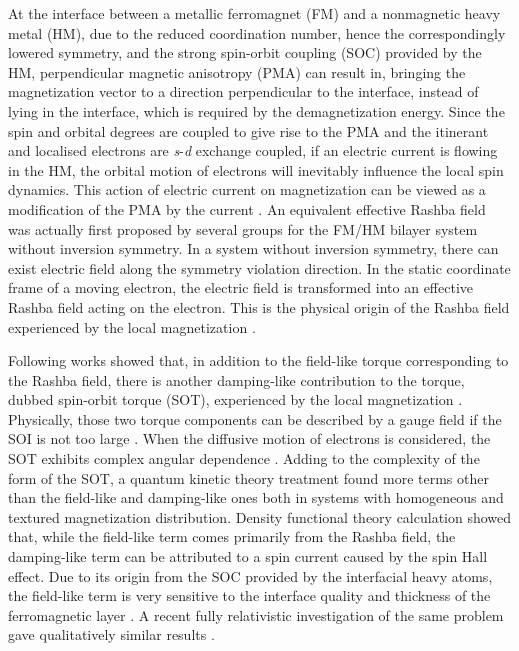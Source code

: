 \documentclass[12pt]{iopart}
\begin{document}
At the interface between a metallic ferromagnet (FM) and a nonmagnetic heavy metal (HM), due to the reduced coordination number, hence the correspondingly lowered symmetry, and the strong spin-orbit coupling (SOC) provided by the HM, perpendicular magnetic anisotropy (PMA) \cite{Bruno89,Bruno-APA} can result in, bringing the magnetization vector to a direction perpendicular to the interface, instead of lying in the interface, which is required by the demagnetization energy. Since the spin and orbital degrees are coupled to give rise to the PMA and the itinerant and localised electrons are \textit{s}-\textit{d} exchange coupled, if an electric current is flowing in the HM, the orbital motion of electrons will inevitably influence the local spin dynamics. This action of electric current on magnetization can be viewed as a modification of the PMA by the current \cite{Garate}. An equivalent effective Rashba field was actually first proposed by several groups \cite{Garate,Manchon,Obata,Matos-Abiague} for the FM/HM bilayer system without inversion symmetry. In a system without inversion symmetry, there can exist electric field along the symmetry violation direction. In the static coordinate frame of a moving electron, the electric field is transformed into an effective Rashba field acting on the electron. This is the physical origin of the Rashba field experienced by the local magnetization \cite{Gambardella}.

Following works showed that, in addition to the field-like torque corresponding to the Rashba field, there is another damping-like contribution to the torque, dubbed spin-orbit torque (SOT), experienced by the local magnetization \cite{Wang12}. Physically, those two torque components can be described by a gauge field if the SOI is not too large \cite{kim13}. When the diffusive motion of electrons is considered, the SOT exhibits complex angular dependence \cite{Ortiz-Pauyac,Wang14}. Adding to the complexity of the form of the SOT, a quantum kinetic theory treatment found more terms other than the field-like and damping-like ones both in systems with homogeneous \cite{Pesin} and textured \cite{van der Bijl} magnetization distribution. Density functional theory calculation \cite{Freimuth13} showed that, while the field-like term comes primarily from the Rashba field, the damping-like term can be attributed to a spin current caused by the spin Hall effect. Due to its origin from the SOC provided by the interfacial heavy atoms, the field-like term is very sensitive to the interface quality and thickness of the ferromagnetic layer \cite{Haney13}. A recent fully relativistic investigation of the same problem gave qualitatively similar results \cite{Wimmer16}.
\end{document}
